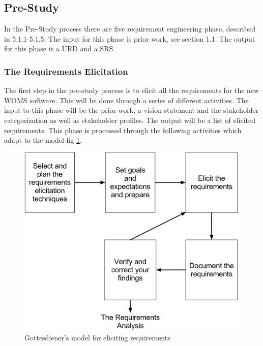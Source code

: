 \documentclass[a4paper]{article}
\begin{document}
\subsection{Pre-Study}
\label{sub:pre_study}
In the Pre-Study process there are five requirement engineering phase, described in 5.1.1-5.1.5. The input for this phase is prior work, see section 1.1. The output for this phase is a URD and a SRS.
\subsubsection{The Requirements Elicitation}
\label{subsub:the_requirements_elicitation}

The first step in the pre-study process is to elicit all the requirements for the new WOMS software. This will be done through a series of different activities. The input to this phase will be the prior work, a vision statement and the stakeholder categorization as well as stakeholder profiles. The output will be a list of elicited requirements. This phase is processed through the following activities which adapt to the model fig \ref{figure:elicitation}. 

\begin{figure}[H]
	\includegraphics[width=1\textwidth]{images/elicitation_model.png}
	\caption{Gottesdiener's model for eliciting requirements \cite{gott3}}
	\label{figure:elicitation}
\end{figure}
\end{document}
